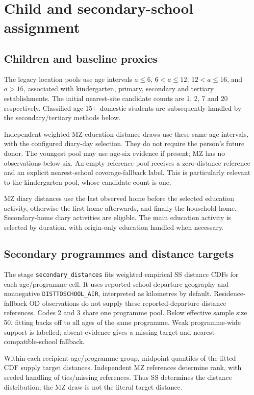 \documentclass[11pt,a4paper]{article}
\newcommand{\code}[1]{\nolinkurl{#1}}
\begin{document}
\section{Child and secondary-school assignment}
\subsection{Children and baseline proxies}

The legacy location pools use age intervals \(a\leq6\), \(6<a\leq12\),
\(12<a\leq16\), and \(a>16\), associated with kindergarten, primary,
secondary and tertiary establishments. The initial nearest-site candidate
counts are 1, 2, 7 and 20 respectively. Classified age-15+ domestic students
are subsequently handled by the secondary/tertiary methods below.

Independent weighted MZ education-distance draws use these same age intervals,
with the configured diary-day selection. They do not require the person's
future donor. The youngest pool may use age-six evidence if present; MZ has
no observations below six. An empty reference pool receives a zero-distance
reference and an explicit nearest-school coverage-fallback label. This is
particularly relevant to the kindergarten pool, whose candidate count is one.

MZ diary distances use the last observed home before the selected education
activity, otherwise the first home afterwards, and finally the household home.
Secondary-home diary activities are eligible. The main education activity is
selected by duration, with origin-only education handled when necessary.

\subsection{Secondary programmes and distance targets}

The stage \code{secondary_distances} fits weighted empirical SS distance CDFs
for each age/programme cell. It uses reported school-departure geography and
nonnegative \code{DISTTOSCHOOL_AIR}, interpreted as kilometres by default.
Residence-fallback OD observations do not supply these reported-departure
distance references. Codes 2 and 3 share one programme pool. Below effective
sample size 50, fitting backs off to all ages of the same programme. Weak
programme-wide support is labelled; absent evidence gives a missing target
and nearest-compatible-school fallback.

Within each recipient age/programme group, midpoint quantiles of the fitted
CDF supply target distances. Independent MZ references determine rank, with
seeded handling of ties/missing references. Thus SS determines the distance
distribution; the MZ draw is not the literal target distance.
\end{document}
